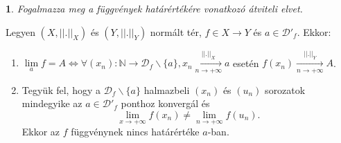 \documentclass[a4paper]{article}
\def\N{\mathbb{N}}
\theoremstyle{qstyle}
\newtheorem{question}{}{}
\begin{document}
	\begin{question}
		Fogalmazza meg a függvények határértékére vonatkozó átviteli elvet.
	\end{question}
	Legyen $(X,||.||_X)$ és $(Y,||.||_Y)$ normált tér, $f\in X\to Y$ és $a\in\mathcal{D}'_f$. Ekkor:
	\vspace{-4mm}
	\begin{enumerate}
		\item $\lim\limits_{a}f = A \Longleftrightarrow \forall (x_n):\N\to\mathcal{D}_f\backslash\{a\}, x_n \xrightarrow[n \to +\infty]{||.||_X} a$ esetén $f(x_n) \xrightarrow[n \to +\infty]{||.||_Y} A$.
		\item Tegyük fel, hogy a $\mathcal{D}_f\backslash\{a\}$ halmazbeli $(x_n)$ és $(u_n)$ sorozatok mindegyike az $a\in\mathcal{D}'_f$ ponthoz konvergál és
		$$\lim\limits_{x\to+\infty}f(x_n) \ne \lim\limits_{n\to+\infty}f(u_n)\text{.}$$
		Ekkor az $f$ függvénynek nincs határértéke $a$-ban.
	\end{enumerate}
	\vspace{-4mm}

	
\end{document}
